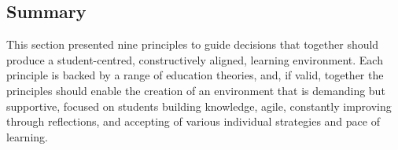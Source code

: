




\subsection{Summary} %
\label{ssub:summary_of_principles_on_how_to_teach}

This section presented nine principles to guide decisions that together should produce a student-centred, constructively aligned, learning environment. Each principle is backed by a range of education theories, and, if valid, together the principles should enable the creation of an environment that is demanding but supportive, focused on students building knowledge, agile, constantly improving through reflections, and accepting of various individual strategies and pace of learning.

